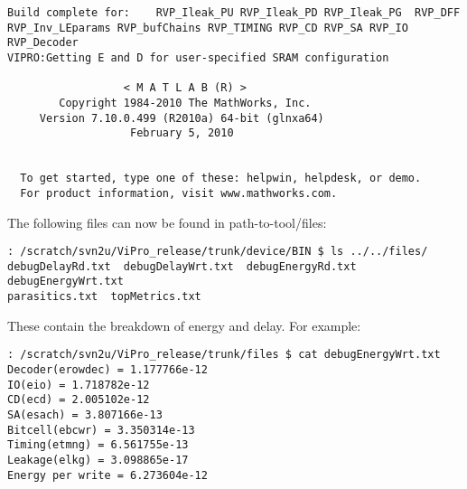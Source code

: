 \begin{verbatim}
Build complete for:    RVP_Ileak_PU RVP_Ileak_PD RVP_Ileak_PG  RVP_DFF 
RVP_Inv_LEparams RVP_bufChains RVP_TIMING RVP_CD RVP_SA RVP_IO RVP_Decoder
VIPRO:Getting E and D for user-specified SRAM configuration
	
	              < M A T L A B (R) >
	    Copyright 1984-2010 The MathWorks, Inc.
	 Version 7.10.0.499 (R2010a) 64-bit (glnxa64)
	               February 5, 2010


  To get started, type one of these: helpwin, helpdesk, or demo.
  For product information, visit www.mathworks.com.
\end{verbatim}

The following files can now be found in path-to-tool/files:

\begin{verbatim}
: /scratch/svn2u/ViPro_release/trunk/device/BIN $ ls ../../files/
debugDelayRd.txt  debugDelayWrt.txt  debugEnergyRd.txt  debugEnergyWrt.txt 
parasitics.txt  topMetrics.txt
\end{verbatim}

These contain the breakdown of energy and delay. For example:
\begin{verbatim}
: /scratch/svn2u/ViPro_release/trunk/files $ cat debugEnergyWrt.txt 
Decoder(erowdec) = 1.177766e-12
IO(eio) = 1.718782e-12
CD(ecd) = 2.005102e-12
SA(esach) = 3.807166e-13
Bitcell(ebcwr) = 3.350314e-13
Timing(etmng) = 6.561755e-13
Leakage(elkg) = 3.098865e-17
Energy per write = 6.273604e-12
\end{verbatim}
